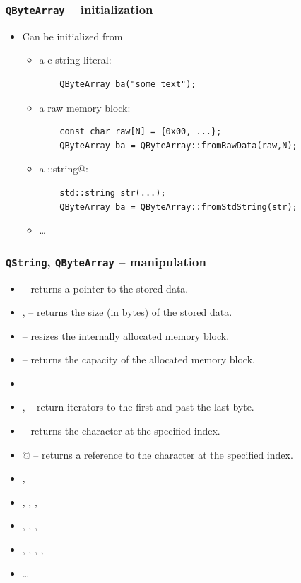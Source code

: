 \begin{frame}[fragile]
  \frametitle{\texttt{QByteArray} -- initialization}
  \begin{itemize}
    \item Can be initialized from
    \begin{itemize}
      \item a c-string literal:
      \begin{verbatim}
	QByteArray ba("some text");
      \end{verbatim}
      \item a raw memory block:
      \begin{verbatim}
	const char raw[N] = {0x00, ...};
	QByteArray ba = QByteArray::fromRawData(raw,N);
      \end{verbatim}
      \item a \verb@std::string@:
      \begin{verbatim}
	std::string str(...);
	QByteArray ba = QByteArray::fromStdString(str);
      \end{verbatim}
      \item \ldots
    \end{itemize}
  \end{itemize}
\end{frame}

\begin{frame}[fragile]
  \frametitle{\texttt{QString}, \texttt{QByteArray} -- manipulation}
  \footnotesize
  \begin{itemize}
    \item \verb@data@ -- returns a pointer to the stored data.
    \item \verb@size@, \verb@length@ -- returns the size (in bytes) of the
    stored data.
    \item \verb@resize@ -- resizes the internally allocated memory block.
    \item \verb@capacity@ -- returns the capacity of the allocated memory block.
    \item \verb@clear@
    \item \verb@begin@, \verb@end@ -- return iterators to the first and past
    the last byte.
    \item \verb@at@ -- returns the character at the specified index.
    \item \verb@operator[]@ -- returns a reference to the character at the
    specified index.
    \item \verb@isNull@, \verb@isEmpty@
    \item \verb@prepend@, \verb@append@, \verb@insert@, \verb@replace@
    \item \verb@startsWith@, \verb@endsWith@, \verb@contains@, \verb@indexOf@
    \item \verb@left@, \verb@right@, \verb@mid@, \verb@chop@, \verb@truncate@
    \item \ldots
  \end{itemize}
\end{frame}

